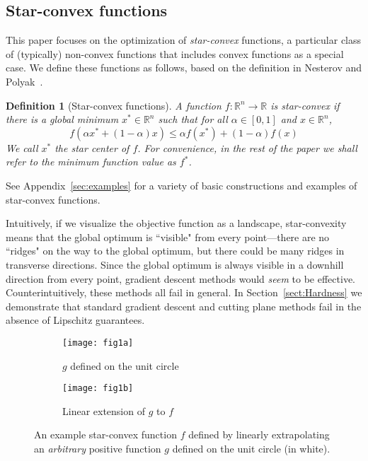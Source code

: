 \documentclass[11pt,letter]{article}
\newcommand{\Real}{\mathbb{R}}
\newcounter{nTheorems}
\numberwithin{nTheorems}{section}
\newtheorem{definition}[nTheorems]{Definition}
\begin{document}
\subsection{Star-convex functions}
This paper focuses on the optimization of \emph{star-convex} functions, a particular class of (typically) non-convex functions that includes convex functions as a special case.
We define these functions as follows, based on the definition in Nesterov and Polyak~\cite{Nesterov:2006}.

\begin{definition}[Star-convex functions]
A function $f : \Real^n \to \Real$ is \emph{star-convex} if there is a global minimum $x^\ast \in \Real^n$ such that for all $\alpha \in [0,1]$ and $x \in \Real^n$,
$$ f(\alpha x^\ast + (1-\alpha)x) \le \alpha f(x^\ast) + (1-\alpha) f(x) $$
We call $x^\ast$ the star center of $f$.
For convenience, in the rest of the paper we shall refer to the minimum function value as $f^\ast$.
\end{definition}

See Appendix~\ref{sec:examples} for a variety of basic constructions and examples of star-convex functions.

Intuitively, if we visualize the objective function as a landscape, star-convexity means that the global optimum is ``visible" from every point---there are no ``ridges" on the way to the global optimum, but there could be many ridges in transverse directions. Since the global optimum is always visible in a downhill direction from every point, gradient descent methods would \emph{seem} to be effective.
Counterintuitively, these methods all fail in general. In Section~\ref{sect:Hardness} we demonstrate that standard gradient descent and cutting plane methods fail in the absence of Lipschitz guarantees.

\begin{figure}
\centering
\begin{subfigure}[b]{.45\textwidth}
\centering
\texttt{[image: fig1a]}
\caption{$g$ defined on the unit circle}
\label{Fig:fig1a}
\end{subfigure}
\quad
\begin{subfigure}[b]{.45\textwidth}
\centering
\texttt{[image: fig1b]}
\caption{Linear extension of $g$ to $f$}
\label{Fig:fig1b}
\end{subfigure}
\caption{An example star-convex function $f$ defined by linearly extrapolating an \emph{arbitrary} positive function $g$ defined on the unit circle (in white).}
\label{Fig:fig1}
\end{figure}
\end{document}
